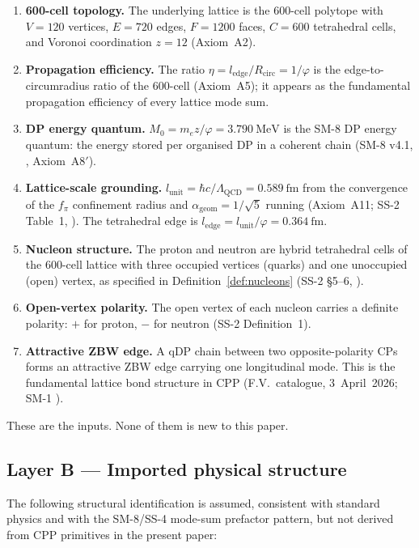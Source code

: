 \documentclass[11pt,letterpaper]{article}
\newcommand{\phig}{\varphi}
\newcommand{\Mzero}{M_0}
\newcommand{\lunit}{l_{\mathrm{unit}}}
\newcommand{\ledge}{l_{\mathrm{edge}}}
\newcommand{\LQCD}{\Lambda_{\mathrm{QCD}}}
\newcommand{\alphageom}{\alpha_{\mathrm{geom}}}
\begin{document}
\begin{enumerate}[label=(A\arabic*)]
\item \textbf{600-cell topology.} The underlying lattice is the 600-cell polytope with $V = 120$ vertices, $E = 720$ edges, $F = 1200$ faces, $C = 600$ tetrahedral cells, and Voronoi coordination $z = 12$ (Axiom~A2).
\item \textbf{Propagation efficiency.} The ratio $\eta = \ledge/R_{\mathrm{circ}} = 1/\phig$ is the edge-to-circumradius ratio of the 600-cell (Axiom~A5); it appears as the fundamental propagation efficiency of every lattice mode sum.
\item \textbf{DP energy quantum.} $\Mzero = m_e z/\phig = 3.790~\mathrm{MeV}$ is the SM-8 DP energy quantum: the energy stored per organised DP in a coherent chain (SM-8 v4.1, \citet{abshier2026sm8}, Axiom~A8$'$).
\item \textbf{Lattice-scale grounding.} $\lunit = \hbar c / \LQCD = 0.589~\mathrm{fm}$ from the convergence of the $f_\pi$ confinement radius and $\alphageom = 1/\sqrt{5}$ running (Axiom~A11; SS-2 Table~1, \citet{abshier2026ss2}). The tetrahedral edge is $\ledge = \lunit/\phig = 0.364~\mathrm{fm}$.
\item \textbf{Nucleon structure.} The proton and neutron are hybrid tetrahedral cells of the 600-cell lattice with three occupied vertices (quarks) and one unoccupied (open) vertex, as specified in Definition~\ref{def:nucleons} (SS-2 \S5--6, \citet{abshier2026ss2}).
\item \textbf{Open-vertex polarity.} The open vertex of each nucleon carries a definite polarity: $+$ for proton, $-$ for neutron (SS-2 Definition~1).
\item \textbf{Attractive ZBW edge.} A qDP chain between two opposite-polarity CPs forms an attractive ZBW edge carrying one longitudinal mode. This is the fundamental lattice bond structure in CPP (F.V.\ catalogue, 3~April~2026; SM-1 \citep{abshier2026sm1}).
\end{enumerate}

These are the inputs. None of them is new to this paper.

\subsection{Layer B --- Imported physical structure}
\label{sec:layerB}

The following structural identification is assumed, consistent with standard physics and with the SM-8/SS-4 mode-sum prefactor pattern, but not derived from CPP primitives in the present paper:
\end{document}
